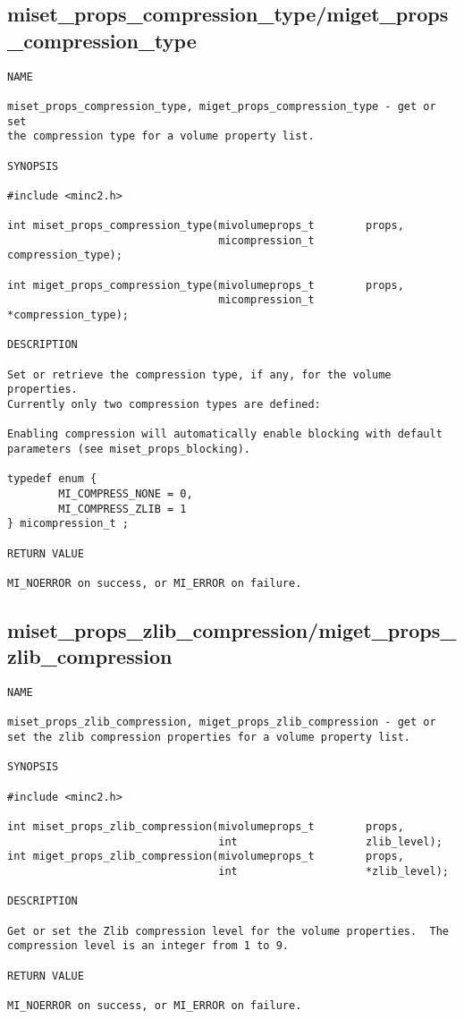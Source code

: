 \documentclass{article}
\begin{document}
\subsection{miset\_props\_compression\_type/miget\_props\_compression\_type}
\begin{verbatim}
NAME

miset_props_compression_type, miget_props_compression_type - get or set
the compression type for a volume property list.

SYNOPSIS

#include <minc2.h>

int miset_props_compression_type(mivolumeprops_t        props, 
                                 micompression_t        compression_type);

int miget_props_compression_type(mivolumeprops_t        props,
                                 micompression_t        *compression_type);

DESCRIPTION

Set or retrieve the compression type, if any, for the volume properties.
Currently only two compression types are defined:

Enabling compression will automatically enable blocking with default
parameters (see miset_props_blocking).

typedef enum {
        MI_COMPRESS_NONE = 0,
        MI_COMPRESS_ZLIB = 1
} micompression_t ;

RETURN VALUE

MI_NOERROR on success, or MI_ERROR on failure.
\end{verbatim}

\subsection{miset\_props\_zlib\_compression/miget\_props\_zlib\_compression}
\begin{verbatim}
NAME 

miset_props_zlib_compression, miget_props_zlib_compression - get or
set the zlib compression properties for a volume property list.

SYNOPSIS

#include <minc2.h>

int miset_props_zlib_compression(mivolumeprops_t        props, 
                                 int                    zlib_level);
int miget_props_zlib_compression(mivolumeprops_t        props, 
                                 int                    *zlib_level);

DESCRIPTION

Get or set the Zlib compression level for the volume properties.  The 
compression level is an integer from 1 to 9.

RETURN VALUE

MI_NOERROR on success, or MI_ERROR on failure.
\end{verbatim}
\end{document}

